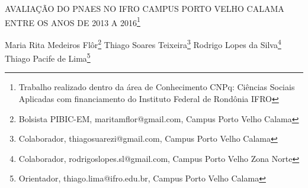 \documentclass[article,12pt,onesidea,4paper,english,brazil]{abntex2}
\begin{document}
	
	
	\frenchspacing 
	
	\begin{center}
		\LARGE AVALIAÇÃO DO PNAES NO IFRO CAMPUS PORTO VELHO CALAMA ENTRE OS ANOS DE 2013 A 2016\footnote{Trabalho realizado dentro da área de Conhecimento CNPq: Ciências Sociais Aplicadas com financiamento do Instituto Federal de Rondônia IFRO}
		
		\normalsize
		Maria Rita Medeiros Flôr\footnote{Bolsista PIBIC-EM, maritamflor@gmail.com, Campus Porto Velho Calama} 
		Thiago Soares Teixeira\footnote{Colaborador, thiagosuarezi@gmail.com, Campus Porto Velho Calama} 
		Rodrigo Lopes da Silva\footnote{Colaborador, rodrigoslopes.sl@gmail.com, Campus Porto Velho Zona Norte} 
		Thiago Pacife de Lima\footnote{Orientador, thiago.lima@ifro.edu.br, Campus Porto Velho Calama} 
	\end{center}
	
\end{document}
